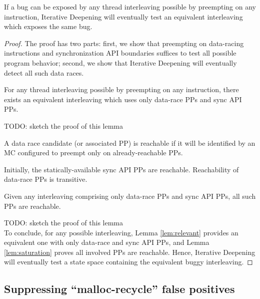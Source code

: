 \begin{theorem}
If a bug can be exposed by any thread interleaving possible by preempting on any instruction,
Iterative Deepening will eventually test an equivalent interleaving which exposes the same bug.
\end{theorem}
\begin{proof}
The proof has two parts:
first, we show that preempting on data-racing instructions and synchronization API boundaries suffices to test all possible program behavior;
second, we show that Iterative Deepening will eventually detect all such data races.

\begin{lemma}
For any thread interleaving possible by preempting on any instruction,
there exists an equivalent interleaving which uses only data-race PPs and sync API PPs.
	\label{lem:relevant}
\end{lemma}

TODO: sketch the proof of this lemma %

\begin{definition}
A data race candidate (or associated PP) is reachable if it will be identified by an MC configured to preempt only on already-reachable PPs.
\end{definition}
Initially, the statically-available sync API PPs are reachable. Reachability of data-race PPs is transitive.
\begin{lemma}
	Given any interleaving comprising only data-race PPs and sync API PPs, all such PPs are reachable.
	\label{lem:saturation}
\end{lemma}

TODO: sketch the proof of this lemma %
\\

To conclude,
for any possible interleaving, Lemma \ref{lem:relevant} provides an equivalent one with only data-race and sync API PPs,
and Lemma \ref{lem:saturation} proves all involved PPs are reachable.
Hence, Iterative Deepening will eventually test a state space containing the equivalent buggy interleaving.
\end{proof}


\subsection{Suppressing ``malloc-recycle'' false positives}
\label{sec:recycle}

